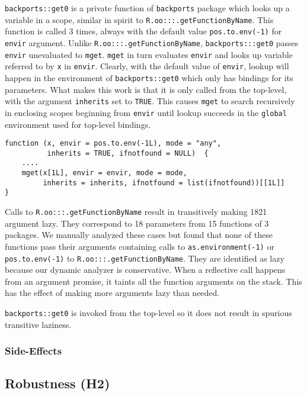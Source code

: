 \documentclass[screen,acmsmall]{acmart}
\newcommand{\code}[1]{\lstinline[style=R]|#1|\xspace}
\begin{document}
\code{backports::get0} is a private function of \code{backports} package which
looks up a variable in a scope, similar in spirit to
\code{R.oo:::.getFunctionByName}. This function is called 3 times, always with
the default value \code{pos.to.env(-1)} for \code{envir} argument. Unlike
\code{R.oo:::.getFunctionByName}, \code{backports:::get0} passes \code{envir}
unevaluated to \code{mget}. \code{mget} in turn evaluates \code{envir} and looks
up variable referred to by \code{x} in \code{envir}. Clearly, with the default
value of \code{envir}, lookup will happen in the environment of
\code{backports::get0} which only has bindings for its parameters. What makes
this work is that it is only called from the top-level, with the argument
\code{inherits} set to \code{TRUE}. This causes \code{mget} to search
recursively in enclosing scopes beginning from \code{envir} until lookup
succeeds in the \code{global} environment used for top-level bindings.

\begin{lstlisting}
function (x, envir = pos.to.env(-1L), mode = "any",
          inherits = TRUE, ifnotfound = NULL)  {
    ....
    mget(x[1L], envir = envir, mode = mode,
         inherits = inherits, ifnotfound = list(ifnotfound))[[1L]]
}
\end{lstlisting}

Calls to \code{R.oo:::.getFunctionByName} result in transitively making 1821
argument lazy. They correspond to 18 parameters from 15 functions of 3 packages.
We manually analyzed these cases but found that none of these functions pass
their arguments containing calls to \code{as.environment(-1)} or
\code{pos.to.env(-1)} to \code{R.oo:::.getFunctionByName}. They are identified
as lazy because our dynamic analyzer is conservative. When a reflective call
happens from an argument promise, it taints all the function arguments on the
stack. This has the effect of making more arguments lazy than needed.

\code{backports::get0} is invoked from the top-level so it does not result in
spurious transitive laziness.

\subsubsection{Side-Effects}

\subsection{Robustness (H2)} \label{Evaluation:Robustness}
\end{document}
